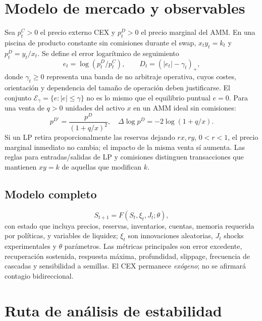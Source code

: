 \documentclass[11pt,a4paper]{article}
\begin{document}
\section{Modelo de mercado y observables}
Sea $p_t^C>0$ el precio externo CEX y $p_t^D>0$ el precio marginal del AMM. En una piscina de producto constante sin comisiones durante el swap, $x_ty_t=k_t$ y $p_t^D=y_t/x_t$. Se define el error logarítmico de seguimiento
\begin{equation}
e_t=\log(p_t^D/p_t^C),\qquad D_t=(|e_t|-\gamma_t)_+,
\end{equation}
donde $\gamma_t\ge 0$ representa una banda de no arbitraje operativa, cuyos costes, orientación y dependencia del tamaño de operación deben justificarse. El conjunto $\mathcal{E}_{\gamma}=\{e:|e|\leq\gamma\}$ no es lo mismo que el equilibrio puntual $e=0$.
Para una venta de $q>0$ unidades del activo $x$ en un AMM ideal sin comisiones:
\begin{equation}
p^{D\prime}=\frac{p^D}{(1+q/x)^2},\quad \Delta\log p^D=-2\log(1+q/x).
\end{equation}
Si un LP retira proporcionalmente las reservas dejando $r x,r y$, $0<r<1$, el precio marginal inmediato no cambia; el impacto de la misma venta sí aumenta. Las reglas para entradas/salidas de LP y comisiones distinguen transacciones que mantienen $xy=k$ de aquellas que modifican $k$.
\subsection{Modelo completo}
\begin{equation}
S_{t+1}=F(S_t,\xi_t,J_t;\theta),
\end{equation}
con estado que incluya precios, reservas, inventarios, cuentas, memoria requerida por políticas, y variables de liquidez; $\xi_t$ son innovaciones aleatorias, $J_t$ shocks experimentales y $\theta$ parámetros. Las métricas principales son error excedente, recuperación sostenida, respuesta máxima, profundidad, slippage, frecuencia de cascadas y sensibilidad a semillas. El CEX permanece \emph{exógeno}; no se afirmará contagio bidireccional.
\section{Ruta de análisis de estabilidad}
\end{document}
